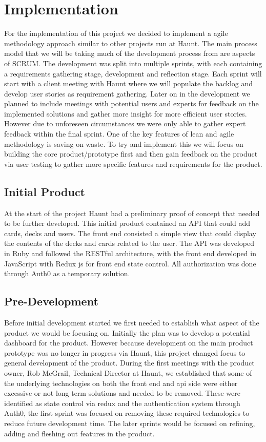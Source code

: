 
\chapter{Implementation}
For the implementation of this project we decided to implement a agile methodology approach similar to other projects run at  Haunt. The main process model that we will be taking much of the development process from are aspects of SCRUM. The development was split into multiple sprints, with each containing a requirements gathering stage, development and reflection stage. Each sprint will start with a client meeting with Haunt where we will populate the backlog and develop user stories as requirement gathering. Later on in the development we planned to include meetings with potential users and experts for feedback on the implemented solutions and gather more insight for more efficient user stories. However due to unforeseen circumstances we were only able to gather expert feedback within the final sprint. One of the key features of lean and agile methodology is saving on waste. To try and implement this we will focus on building the core product/prototype first and then gain feedback on the product via user testing to gather more specific features and requirements for the product.

\section{Initial Product}
At the start of the project Haunt had a preliminary proof of concept that needed to be further developed. This initial product contained an API that could add cards, decks and users. The front end consisted a simple view that could display the contents of the decks and cards related to the user. The API was developed in Ruby and followed the RESTful architecture, with the front end developed in JavaScript with Redux js for front end state control. All authorization was done through Auth0 as a temporary solution.

\section{Pre-Development}
Before initial development started we first needed to establish what aspect of the product we would be focusing on. Initially the plan was to develop a potential dashboard for the product. However because development on the main product prototype was no longer in progress via Haunt, this project changed focus to general development of the product.
During the first meetings with the product owner, Rob McGrail, Technical Director at Haunt, we established that some of the underlying technologies on both the front end and api side were either excessive or not long term solutions and needed to be removed. These were identified as state control via redux and the authentication system through Auth0, the first sprint was focused on removing these required technologies to reduce future development time. The later sprints would be focused on refining, adding and fleshing out features in the product.

